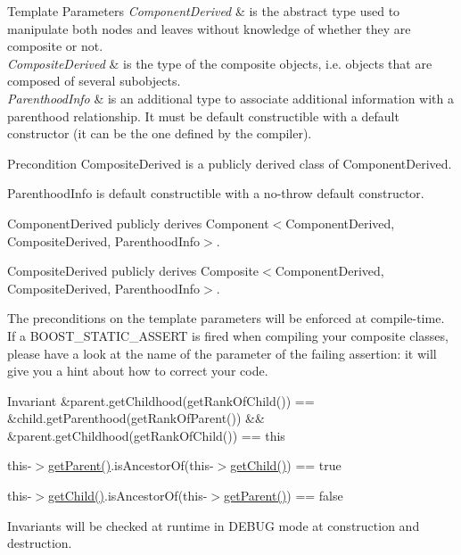 \begin{DoxyTemplParams}{Template Parameters}
{\em Component\+Derived} & is the abstract type used to manipulate both nodes and leaves without knowledge of whether they are composite or not. \\
\hline
{\em Composite\+Derived} & is the type of the composite objects, i.\+e. objects that are composed of several subobjects. \\
\hline
{\em Parenthood\+Info} & is an additional type to associate additional information with a parenthood relationship. It must be default constructible with a default constructor (it can be the one defined by the compiler).\\
\hline
\end{DoxyTemplParams}
\begin{DoxyPrecond}{Precondition}
Composite\+Derived is a publicly derived class of Component\+Derived. 

Parenthood\+Info is default constructible with a no-\/throw default constructor. 

Component\+Derived publicly derives Component$<$\+Component\+Derived, Composite\+Derived, Parenthood\+Info$>$. 

Composite\+Derived publicly derives Composite$<$\+Component\+Derived, Composite\+Derived, Parenthood\+Info$>$.
\end{DoxyPrecond}
The preconditions on the template parameters will be enforced at compile-\/time. If a B\+O\+O\+S\+T\+\_\+\+S\+T\+A\+T\+I\+C\+\_\+\+A\+S\+S\+E\+RT is fired when compiling your composite classes, please have a look at the name of the parameter of the failing assertion\+: it will give you a hint about how to correct your code.

\begin{DoxyInvariant}{Invariant}
\&parent.\+get\+Childhood(get\+Rank\+Of\+Child()) == \&child.\+get\+Parenthood(get\+Rank\+Of\+Parent()) \&\& \&parent.\+get\+Childhood(get\+Rank\+Of\+Child()) == this 

this-\/$>$\hyperlink{classocra_1_1Parenthood_af177c0f77e5448b9d2ce8d795d143f45}{get\+Parent()}.is\+Ancestor\+Of(this-\/$>$\hyperlink{classocra_1_1Parenthood_ae574a4ecbcc5b7adcdff9692329579c3}{get\+Child()}) == true 

this-\/$>$\hyperlink{classocra_1_1Parenthood_ae574a4ecbcc5b7adcdff9692329579c3}{get\+Child()}.is\+Ancestor\+Of(this-\/$>$\hyperlink{classocra_1_1Parenthood_af177c0f77e5448b9d2ce8d795d143f45}{get\+Parent()}) == false
\end{DoxyInvariant}
Invariants will be checked at runtime in D\+E\+B\+UG mode at construction and destruction. 

